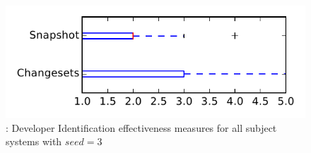 
\begin{figure}
\centering
\includegraphics[height=0.4\textheight]{figures/dit_seed/rq1_tiny_3}
\caption{\rtwo: Developer Identification effectiveness measures for all subject systems with $seed=3$}
\label{fig:dit_seed:rq1:tiny}
\end{figure}
